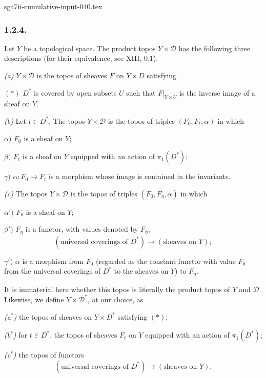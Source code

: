 \begin{filecontents*}{sga7ii-cumulative-input-040.tex}
\subsubsection*{1.2.4.}
Let $Y$ be a topological space.  The product topos
$Y\times\mathcal D$ has the following three descriptions (for their
equivalence, see XIII, 0.1).

\medskip
\noindent\textit{(a)} $Y\times\mathcal D$ is the topos of sheaves
$F$ on $Y\times D$ satisfying

\smallskip
\noindent $(*)$ $D^*$ is covered by open subsets $U$ such that
$F|_{Y\times U}$ is the inverse image of a sheaf on $Y$.

\medskip
\noindent\textit{(b)} Let $t\in D^*$.  The topos
$Y\times\mathcal D$ is the topos of triples $(F_0,F_t,\alpha)$ in
which

\smallskip
\noindent $\alpha)$ $F_0$ is a sheaf on $Y$;

\noindent $\beta)$ $F_t$ is a sheaf on $Y$ equipped with an action
of $\pi_1(D^*)$;

\noindent $\gamma)$ $\alpha:F_0\longrightarrow F_t$ is a morphism
whose image is contained in the invariants.

\medskip
\noindent\textit{(c)} The topos $Y\times\mathcal D$ is the topos of
triples $(F_0,F_\eta,\alpha)$ in which

\smallskip
\noindent $\alpha')$ $F_0$ is a sheaf on $Y$;

\noindent $\beta')$ $F_\eta$ is a functor, with values denoted by
$F_{\bar\eta}$,
\[
(\text{universal coverings of }D^*)
\longrightarrow(\text{sheaves on }Y);
\]

\noindent $\gamma')$ $\alpha$ is a morphism from $F_0$ (regarded as
the constant functor with value $F_0$ from the universal coverings
of $D^*$ to the sheaves on $Y$) to $F_\eta$.

It is immaterial here whether this topos is literally the product
topos of $Y$ and $\mathcal D$.  Likewise, we define
$Y\times\mathcal D^*$, at our choice, as

\medskip
\noindent\textit{(a$^*$)} the topos of sheaves on $Y\times D^*$
satisfying $(*)$;

\noindent\textit{(b$^*$)} for $t\in D^*$, the topos of sheaves $F_t$
on $Y$ equipped with an action of $\pi_1(D^*)$;

\noindent\textit{(c$^*$)} the topos of functors
\[
(\text{universal coverings of }D^*)
\longrightarrow(\text{sheaves on }Y).
\]

\end{filecontents*}
